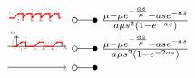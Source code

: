 \begin{footnotesize}
\[\begin{array}{@{}l@{ ~ \laplace ~ }l@{}}
\begin{tikzpicture}[domain=0:5, scale=\graphtabscale, every node/.style={scale=\graphtabscale}]
    \draw[thick, red]
        (-0.5,0)
        --
        (0,0)
        --
        (0.5,0.5)
        --
        (1,0.5)
        --
        (1,0) node[below, black] {$a$}
        --
        (1.5,0.5)
        --
        (2,0.5)
        --
        (2,0) node[below, black] {$2a$}
        --
        (2.5,0.5)
        --
        (3,0.5)
        --
        (3,0) node[below, black] {$3a$}
        --
        (3.5,0.5)
        --
        (4,0.5)
        --
        (4,0) node[below, black] {$4a$}
        --
        (4.5,0.5)
        --
        (5,0.5)
        --
        (5,0)
        --
        (5.2,0);
    \draw[dotted] (-0.2,0.5) node[left] {$\frac{1}{\mu}$} -- (5,0.5);
    \draw[dotted] (0.5,0.5) -- (1,1) -- (1,0.5);
    \draw[dotted] (1.5,0.5) -- (2,1) -- (2,0.5);
    \draw[dotted] (2.5,0.5) -- (3,1) -- (3,0.5);
    \draw[dotted] (3.5,0.5) -- (4,1) -- (4,0.5);
    \draw[dotted] (4.5,0.5) -- (5,1) -- (5,0.5);
    \draw[dotted] (0.5,0.5) -- (0.5,0) node[below] {$\frac{a}{\mu}$};
\end{tikzpicture} &
    \frac{\mu - \mu e^{-\frac{as}{\mu}} - as e^{-as}}{a\mu s^2 (1 - e^{-as})} \\
\begin{tikzpicture}[domain=0:5, scale=\graphtabscale, every node/.style={scale=\graphtabscale}]
    \draw[->] (-1,0) -- (5.5,0) node[below] {$t$};
    \draw[->] (0,-0.1) -- (0,1.2) node[above left] {$f(t)$};
    \draw[-] (-0.1,1) node[left] {$1$} -- (0.1,1);
    \draw[thick, red]
        (-0.5,0)
        --
        (0,0)
        --
        (0.5,0.5)
        --
        (1,0.5)
        --
        (1,0) node[below, black] {$a$}
        --
        (2,0) node[below, black] {$2a$}
        --
        (2.5,0.5)
        --
        (3,0.5)
        --
        (3,0) node[below, black] {$3a$}
        --
        (4,0) node[below, black] {$4a$}
        --
        (4.5,0.5)
        --
        (5,0.5)
        --
        (5,0)
        --
        (5,0);
    \draw[dotted] (-0.2,0.5) node[left] {$\frac{1}{\mu}$} -- (5,0.5);
    \draw[dotted] (0.5,0.5) -- (1,1) -- (1,0.5);
    \draw[dotted] (2.5,0.5) -- (3,1) -- (3,0.5);
    \draw[dotted] (4.5,0.5) -- (5,1) -- (5,0.5);
    \draw[dotted] (0.5,0.5) -- (0.5,0) node[below] {$\frac{a}{\mu}$};
\end{tikzpicture} &
    \frac{\mu - \mu e^{-\frac{as}{\mu}} - as e^{-as}}{a \mu s^2 (1 - e^{-2as})} \\
\begin{tikzpicture}[domain=0:5, scale=\graphtabscale, every node/.style={scale=\graphtabscale}]
    \draw[->] (-1,0) -- (5.5,0) node[below] {$t$};

\end{tikzpicture}
\end{array}\]
\end{footnotesize}

